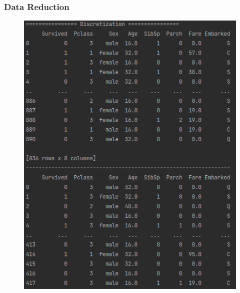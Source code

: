 \documentclass{beamer}
\begin{document}
\begin{frame}
\frametitle{Data Reduction}
\begin{center}
	\begin{figure}
    \includegraphics[width=0.5\linewidth]{./src/figures/6.png}
  \end{figure}
\end{center}
\end{frame}

\end{document}
